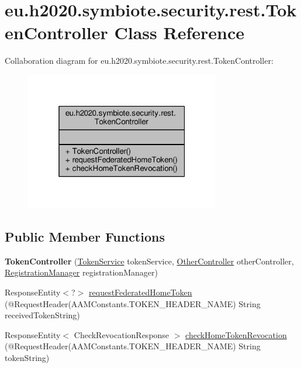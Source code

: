 \hypertarget{classeu_1_1h2020_1_1symbiote_1_1security_1_1rest_1_1TokenController}{}\section{eu.\+h2020.\+symbiote.\+security.\+rest.\+Token\+Controller Class Reference}
\label{classeu_1_1h2020_1_1symbiote_1_1security_1_1rest_1_1TokenController}


Collaboration diagram for eu.\+h2020.\+symbiote.\+security.\+rest.\+Token\+Controller\+:
\nopagebreak
\begin{figure}[H]
\begin{center}
\leavevmode
\includegraphics[width=241pt]{classeu_1_1h2020_1_1symbiote_1_1security_1_1rest_1_1TokenController__coll__graph}
\end{center}
\end{figure}
\subsection*{Public Member Functions}
\begin{DoxyCompactItemize}
\item 
{\bfseries Token\+Controller} (\hyperlink{classeu_1_1h2020_1_1symbiote_1_1security_1_1services_1_1TokenService}{Token\+Service} token\+Service, \hyperlink{classeu_1_1h2020_1_1symbiote_1_1security_1_1rest_1_1OtherController}{Other\+Controller} other\+Controller, \hyperlink{classeu_1_1h2020_1_1symbiote_1_1security_1_1commons_1_1RegistrationManager}{Registration\+Manager} registration\+Manager)\hypertarget{classeu_1_1h2020_1_1symbiote_1_1security_1_1rest_1_1TokenController_a874c25b7344d2e3c4a1f31e60cb5470e}{}\label{classeu_1_1h2020_1_1symbiote_1_1security_1_1rest_1_1TokenController_a874c25b7344d2e3c4a1f31e60cb5470e}

\item 
Response\+Entity$<$?$>$ \hyperlink{classeu_1_1h2020_1_1symbiote_1_1security_1_1rest_1_1TokenController_a9147c8773dcc5641313470146020ddbd}{request\+Federated\+Home\+Token} (@Request\+Header(A\+A\+M\+Constants.\+T\+O\+K\+E\+N\+\_\+\+H\+E\+A\+D\+E\+R\+\_\+\+N\+A\+ME) String received\+Token\+String)
\item 
Response\+Entity$<$ Check\+Revocation\+Response $>$ \hyperlink{classeu_1_1h2020_1_1symbiote_1_1security_1_1rest_1_1TokenController_a1393bd5ddb530a43c3021a4cd422bb7a}{check\+Home\+Token\+Revocation} (@Request\+Header(A\+A\+M\+Constants.\+T\+O\+K\+E\+N\+\_\+\+H\+E\+A\+D\+E\+R\+\_\+\+N\+A\+ME) String token\+String)
\end{DoxyCompactItemize}


